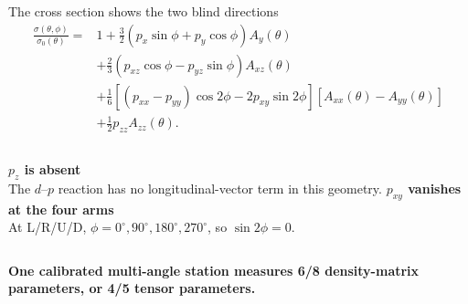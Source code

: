 \documentclass[aspectratio=169,11pt]{beamer}
\begin{document}
\begin{frame}{The cross section shows the two blind directions}
  \footnotesize
  \begin{align*}
    \frac{\sigma(\theta,\phi)}{\sigma_0(\theta)}={}&1
      +\frac32\left(p_x\sin\phi+p_y\cos\phi\right)A_y(\theta)\\
      &+\frac23\left(p_{xz}\cos\phi-p_{yz}\sin\phi\right)A_{xz}(\theta)\\
      &+\frac16\left[(p_{xx}-p_{yy})\cos2\phi-2p_{xy}\sin2\phi\right]
        \left[A_{xx}(\theta)-A_{yy}(\theta)\right]\\
      &+\frac12p_{zz}A_{zz}(\theta).
  \end{align*}
  \normalsize

  \vspace{-0.35em}
  \begin{columns}[T,onlytextwidth]
      \textbf{$p_z$ is absent}\\[0.15em]
      The $d$--$p$ reaction has no longitudinal-vector term in this geometry.
      \textbf{$p_{xy}$ vanishes at the four arms}\\[0.15em]
      At L/R/U/D, $\phi=0^\circ,90^\circ,180^\circ,270^\circ$, so $\sin2\phi=0$.
  \end{columns}

  \vspace{0.20em}
  {\color{Teal}\bfseries One calibrated multi-angle station measures 6/8 density-matrix parameters, or 4/5 tensor parameters.}
\end{frame}
\end{document}
